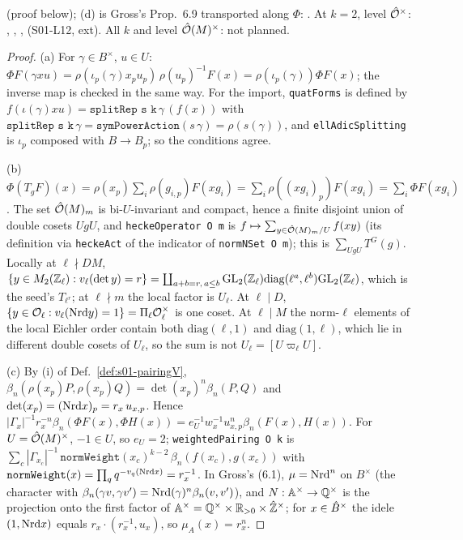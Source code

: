 \noindent\stproved{} (proof below); (d) is Gross's Prop.~6.9 transported along $\Phi$:
\stcited{} . At $k=2$, level $\hat{\mathcal{O}}^\times$: ,
, ,
 \stformal{} (S01-L12, ext). All $k$ and level $\hat{\mathcal{O}}(M)^\times$: not planned.
\begin{proof}
(a) For $\gamma\in B^\times$, $u\in U$: $\Phi F(\gamma xu)=\rho(\iota_p(\gamma)x_pu_p)\,\rho(u_p)^{-1}F(x)=\rho(\iota_p(\gamma))\Phi F(x)$; the inverse map is
checked in the same way. For the import, \texttt{quatForms} is defined by $f(\iota(\gamma)xu)=\texttt{splitRep s k}\,\gamma\,(f(x))$ with
$\texttt{splitRep s k}\,\gamma=\texttt{symPowerAction}(s\,\gamma)=\rho(s(\gamma))$, and \texttt{ellAdicSplitting} is $\iota_p$ composed with
$B\to B_p$; so the conditions agree.

(b) $\Phi(T_gF)(x)=\rho(x_p)\sum_i\rho(g_{i,p})F(xg_i)=\sum_i\rho((xg_i)_p)F(xg_i)=\sum_i\Phi F(xg_i)$. The set $\hat{\mathcal{O}}(M)_m$ is bi-$U$-invariant
and compact, hence a finite disjoint union of double cosets $UgU$, and \texttt{heckeOperator O m} is $f\mapsto\sum_{y\in\hat{\mathcal{O}}(M)_m/U}f(xy)$ (its
definition via \texttt{heckeAct} of the indicator of \texttt{normNSet O m}); this is $\sum_{UgU}T^G(g)$. Locally at $\ell\nmid DM$,
$\{y\in M_2(\mathbb{Z}_\ell):v_\ell(\det y)=r\}=\coprod_{a+b=r,\,a\le b}\mathrm{GL}_2(\mathbb{Z}_\ell)\mathrm{diag}(\ell^a,\ell^b)\mathrm{GL}_2(\mathbb{Z}_\ell)$, which is the seed's
$T_{\ell^r}$; at $\ell\nmid m$ the local factor is $U_\ell$. At $\ell\mid D$, $\{y\in\mathcal{O}_\ell:v_\ell(\mathrm{Nrd} y)=1\}=\Pi_\ell\mathcal{O}_\ell^\times$ is one coset. At
$\ell\mid M$ the norm-$\ell$ elements of the local Eichler order contain both $\mathrm{diag}(\ell,1)$ and $\mathrm{diag}(1,\ell)$, which lie in
different double cosets of $U_\ell$, so the sum is not $U_\ell=[U\varpi_\ell U]$.

(c) By (i) of Def.~\ref{def:s01-pairingV}, $\beta_n(\rho(x_p)P,\rho(x_p)Q)=\det(x_p)^n\beta_n(P,Q)$ and $\det(x_p)=(\mathrm{Nrd} x)_p=r_x\,u_{x,p}$. Hence
$|\Gamma_x|^{-1}r_x^{-n}\beta_n(\Phi F(x),\Phi H(x))=e_U^{-1}w_x^{-1}u_{x,p}^n\beta_n(F(x),H(x))$. For $U=\hat{\mathcal{O}}(M)^\times$, $-1\in U$, so $e_U=2$;
\texttt{weightedPairing O k} is $\sum_c|\Gamma_{x_c}|^{-1}\,\texttt{normWeight}(x_c)^{k-2}\,\beta_n(f(x_c),g(x_c))$ with
$\texttt{normWeight}(x)=\prod_q q^{-v_q(\mathrm{Nrd} x)}=r_x^{-1}$. In Gross's (6.1), $\mu=\mathrm{Nrd}^n$ on $B^\times$ (the character with
$\beta_n(\gamma v,\gamma v')=\mathrm{Nrd}(\gamma)^n\beta_n(v,v')$), and $N:\mathbb{A}^\times\to\mathbb{Q}^\times$ is the projection onto the first factor of
$\mathbb{A}^\times=\mathbb{Q}^\times\times\mathbb{R}_{>0}\times\hat{\mathbb{Z}}^\times$; for $x\in\hat{B}^\times$ the idele $(1,\mathrm{Nrd} x)$ equals $r_x\cdot(r_x^{-1},u_x)$, so $\mu_A(x)=r_x^n$.


\end{proof}
